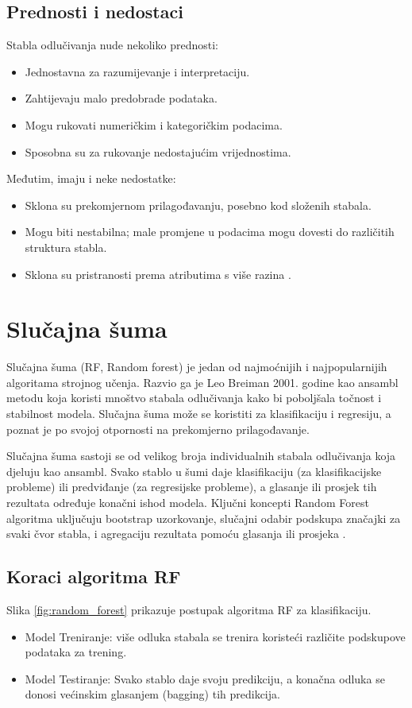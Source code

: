 \documentclass[zavrsnirad]{fer}
\begin{document}
\subsection{Prednosti i nedostaci}
Stabla odlučivanja nude nekoliko prednosti:
\begin{itemize}
	\item Jednostavna za razumijevanje i interpretaciju.
	\item Zahtijevaju malo predobrade podataka.
	\item Mogu rukovati numeričkim i kategoričkim podacima.
	\item Sposobna su za rukovanje nedostajućim vrijednostima.
\end{itemize}

Međutim, imaju i neke nedostatke:
\begin{itemize}
	\item Sklona su prekomjernom prilagođavanju, posebno kod složenih stabala.
	\item Mogu biti nestabilna; male promjene u podacima mogu dovesti do različitih struktura stabla.
	\item Sklona su pristranosti prema atributima s više razina \cite{Charbuty_Abdulazeez_2021}\cite{somvanshi2016}.
\end{itemize}



\section{Slučajna šuma}
Slučajna šuma (RF, Random forest) je jedan od najmoćnijih i najpopularnijih algoritama strojnog učenja. Razvio ga je Leo Breiman 2001. godine kao ansambl metodu koja koristi mnoštvo stabala odlučivanja kako bi poboljšala točnost i stabilnost modela. Slučajna šuma može se koristiti za klasifikaciju i regresiju, a poznat je po svojoj otpornosti na prekomjerno prilagođavanje.

Slučajna šuma sastoji se od velikog broja individualnih stabala odlučivanja koja djeluju kao ansambl. Svako stablo u šumi daje klasifikaciju (za klasifikacijske probleme) ili predviđanje (za regresijske probleme), a glasanje ili prosjek tih rezultata određuje konačni ishod modela. Ključni koncepti Random Forest algoritma uključuju bootstrap uzorkovanje, slučajni odabir podskupa značajki za svaki čvor stabla, i agregaciju rezultata pomoću glasanja ili prosjeka \cite{geeksforgeeks2021}.

\subsection{Koraci algoritma RF}
Slika \ref{fig:random_forest} prikazuje postupak algoritma RF za klasifikaciju.
\begin{itemize} 
	\item Model Treniranje: više odluka stabala se trenira koristeći različite podskupove podataka za trening.
	\item Model Testiranje: Svako stablo daje svoju predikciju, a konačna odluka se donosi većinskim glasanjem (bagging) tih predikcija.
\end{itemize}
\end{document}
